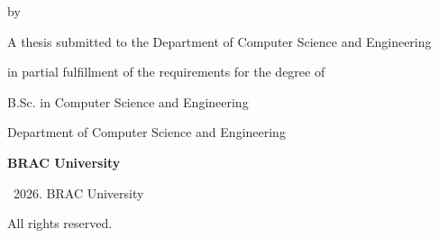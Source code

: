 \begin{titlepage}
\thispagestyle{empty}
\centering
\vspace*{0.8cm}
\begin{minipage}{0.95\textwidth}
  \centering\fontsize{17.28}{22}\selectfont\bfseries
  \FullThesisTitle\par
\end{minipage}
\par\vspace{0.9cm}
{\large by\par}
\vspace{0.55cm}
\begin{minipage}{0.78\textwidth}
\centering
{\large \StudentOne\par}
\vspace{0.07cm}{\normalsize \StudentOneID\par}
\vspace{0.27cm}
{\large \StudentTwo\par}
\vspace{0.07cm}{\normalsize \StudentTwoID\par}
\vspace{0.27cm}
{\large \StudentThree\par}
\vspace{0.07cm}{\normalsize \StudentThreeID\par}
\vspace{0.27cm}
{\large \StudentFour\par}
\vspace{0.07cm}{\normalsize \StudentFourID\par}
\end{minipage}
\par\vspace{0.9cm}
\begin{minipage}{0.93\textwidth}
\centering\normalsize
A thesis submitted to the Department of Computer Science and Engineering\par
in partial fulfillment of the requirements for the degree of\par
B.Sc. in Computer Science and Engineering\par
\end{minipage}
\par\vspace{0.85cm}
{Department of Computer Science and Engineering\par}
\vspace{0.10cm}
{\large\bfseries BRAC University\par}
\vspace{0.5cm}
{\SubmissionMonth\par}
\vfill
{\small\textcopyright\ 2026. BRAC University\par All rights reserved.\par}
\vspace*{0.30cm}
\end{titlepage}
